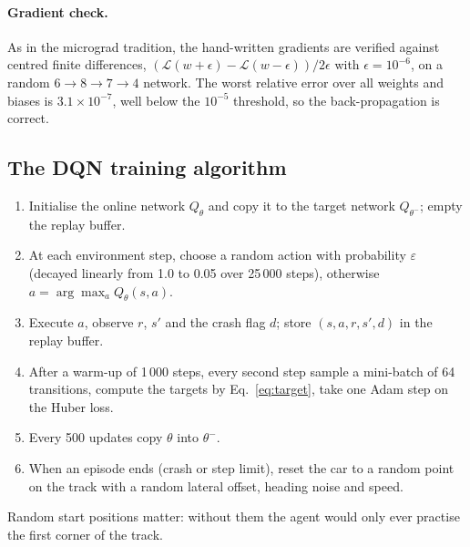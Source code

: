 \documentclass[11pt,a4paper]{article}
\begin{document}
\paragraph{Gradient check.}
As in the micrograd tradition, the hand-written gradients are verified against centred finite differences, \((\mathcal L(w+\epsilon)-\mathcal L(w-\epsilon))/2\epsilon\) with \(\epsilon=10^{-6}\), on a random \(6\to8\to7\to4\) network.
The worst relative error over all weights and biases is \(3.1\times10^{-7}\), well below the \(10^{-5}\) threshold, so the back-propagation is correct.

\subsection{The DQN training algorithm}
\begin{enumerate}[label=\textbf{\arabic*.}]
  \item Initialise the online network \(Q_\theta\) and copy it to the target network \(Q_{\theta^-}\); empty the replay buffer.
  \item At each environment step, choose a random action with probability \(\varepsilon\) (decayed linearly from 1.0 to 0.05 over 25\,000 steps), otherwise \(a=\arg\max_aQ_\theta(s,a)\).
  \item Execute \(a\), observe \(r\), \(s'\) and the crash flag \(d\); store \((s,a,r,s',d)\) in the replay buffer.
  \item After a warm-up of 1\,000 steps, every second step sample a mini-batch of 64 transitions, compute the targets by Eq.~\eqref{eq:target}, take one Adam step on the Huber loss.
  \item Every 500 updates copy \(\theta\) into \(\theta^-\).
  \item When an episode ends (crash or step limit), reset the car to a random point on the track with a random lateral offset, heading noise and speed.
\end{enumerate}
Random start positions matter: without them the agent would only ever practise the first corner of the track.
\end{document}
